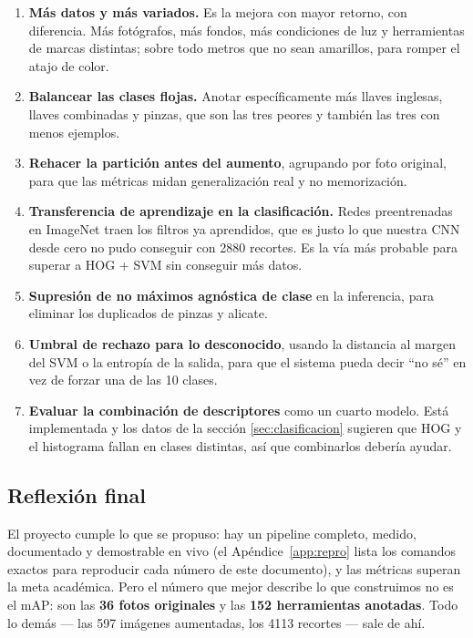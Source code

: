 \documentclass[11pt,a4paper]{article}
\begin{document}
\begin{enumerate}
  \item \textbf{Más datos y más variados.} Es la mejora con mayor retorno, con diferencia. Más
        fotógrafos, más fondos, más condiciones de luz y herramientas de marcas distintas; sobre
        todo metros que no sean amarillos, para romper el atajo de color.
  \item \textbf{Balancear las clases flojas.} Anotar específicamente más llaves inglesas, llaves
        combinadas y pinzas, que son las tres peores y también las tres con menos ejemplos.
  \item \textbf{Rehacer la partición antes del aumento}, agrupando por foto original, para que las
        métricas midan generalización real y no memorización.
  \item \textbf{Transferencia de aprendizaje en la clasificación.} Redes preentrenadas en ImageNet
        traen los filtros ya aprendidos, que es justo lo que nuestra CNN desde cero no pudo
        conseguir con 2880 recortes. Es la vía más probable para superar a HOG + SVM sin conseguir
        más datos.
  \item \textbf{Supresión de no máximos agnóstica de clase} en la inferencia, para eliminar los
        duplicados de pinzas y alicate.
  \item \textbf{Umbral de rechazo para lo desconocido}, usando la distancia al margen del SVM o la
        entropía de la salida, para que el sistema pueda decir \enquote{no sé} en vez de forzar una
        de las 10 clases.
  \item \textbf{Evaluar la combinación de descriptores} como un cuarto modelo. Está implementada y
        los datos de la sección \ref{sec:clasificacion} sugieren que HOG y el histograma fallan en
        clases distintas, así que combinarlos debería ayudar.
\end{enumerate}

\subsection{Reflexión final}

El proyecto cumple lo que se propuso: hay un pipeline completo, medido, documentado y demostrable
en vivo (el Apéndice~\ref{app:repro} lista los comandos exactos para reproducir cada número de este
documento), y las métricas superan la meta académica. Pero el número que mejor describe lo que
construimos no es el mAP: son las \textbf{36 fotos originales} y las \textbf{152 herramientas
anotadas}. Todo lo demás --- las 597 imágenes aumentadas, los 4113 recortes --- sale de ahí.
\end{document}
